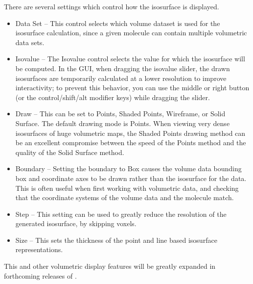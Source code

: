 There are several settings which control how the isosurface is displayed.
\begin{itemize}

\item Data Set -- This control selects which volume dataset is used for the
isosurface calculation, since a given molecule can contain multiple
volumetric data sets.

\item Isovalue -- The Isovalue control selects the value for which the
isosurface will be computed. In the GUI, when dragging the isovalue slider,
the drawn isosurfaces are temporarily calculated at a lower resolution to 
improve interactivity; to prevent this behavior, you can use the middle or 
right button (or the control/shift/alt modifier keys) while dragging the slider.

\item Draw -- This can be set to {\sf Points}, {\sf Shaded Points},
{\sf Wireframe}, or {\sf Solid Surface}.  The default drawing mode is
{\sf Points}.  When viewing very dense isosurfaces of huge volumetric
maps, the {\sf Shaded Points} drawing method can be an excellent compromise
between the speed of the {\sf Points} method and the quality of the
{\sf Solid Surface} method.

\item Boundary -- Setting the boundary to {\sf Box} causes the volume data
bounding box and coordinate axes to be drawn rather than the isosurface for
the data.  This is often useful when first working with volumetric data, and
checking that the coordinate systems of the volume data and the molecule
match.

\item Step -- This setting can be used to greatly reduce 
the resolution of the generated isosurface, by skipping voxels.

\item Size -- This sets the thickness of the point and 
              line based isosurface representations.

\end{itemize}
This and other volumetric display features will be greatly expanded in
forthcoming releases of \VMD.


